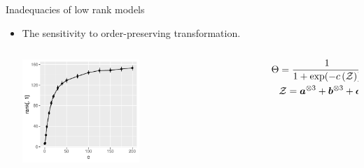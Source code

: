 \documentclass[10pt, mathserif]{beamer} %
\theoremstyle{definition}
\theoremstyle{plain}
\begin{document}
\begin{frame}{Inadequacies of low rank models}
 \begin{itemize}         
    \item The sensitivity to order-preserving transformation.
      \begin{columns}
\begin{column}{0.6\textwidth}
   \begin{center}
     \includegraphics[width=0.5\textwidth]{example1.pdf}
     \end{center}
\end{column}
\begin{column}{0.5\textwidth} 
\begin{align}\Theta &= {1\over 1+\exp(-c\left(\mathcal{Z}\right))},\quad\text{ where }\\&\mathcal{Z} = \bm a^{\otimes3}+ \bm b^{\otimes3}+ \bm c^{\otimes3}.\end{align}

\end{column}
\end{columns}
      
\end{itemize}
\end{frame}
\end{document}
